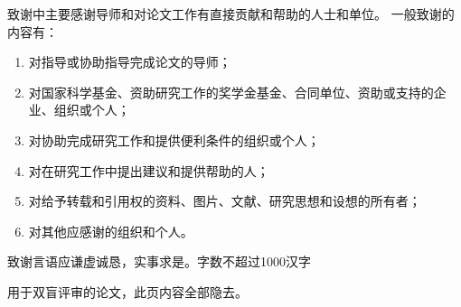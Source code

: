 致谢中主要感谢导师和对论文工作有直接贡献和帮助的人士和单位。
一般致谢的内容有：
\begin{enumerate}[label=(\chinese*),itemindent=2em]

    \item 对指导或协助指导完成论文的导师；
    \item 对国家科学基金、资助研究工作的奖学金基金、合同单位、资助或支持的企业、组织或个人；
    \item 对协助完成研究工作和提供便利条件的组织或个人；
    \item 对在研究工作中提出建议和提供帮助的人；
    \item 对给予转载和引用权的资料、图片、文献、研究思想和设想的所有者；
    \item 对其他应感谢的组织和个人。

\end{enumerate}

致谢言语应谦虚诚恳，实事求是。字数不超过1000汉字

\vspace{\baselineskip}
{\color{red} 用于双盲评审的论文，此页内容全部隐去。}

